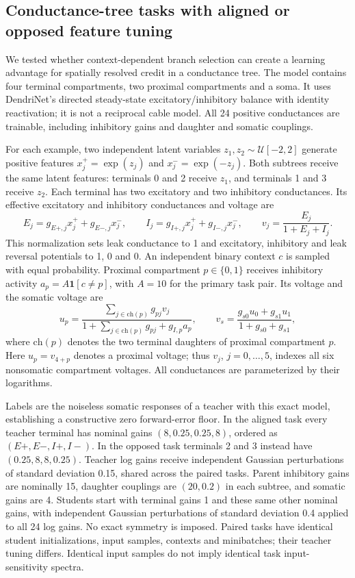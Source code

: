 \subsection*{Conductance-tree tasks with aligned or opposed feature tuning}
\label{sec:conductance-credit-demand}
We tested whether context-dependent branch selection can create a learning advantage for spatially resolved credit in a conductance tree. The model contains four terminal compartments, two proximal compartments and a soma. It uses DendriNet's directed steady-state excitatory/inhibitory balance with identity reactivation; it is not a reciprocal cable model. All 24 positive conductances are trainable, including inhibitory gains and daughter and somatic couplings.

For each example, two independent latent variables $z_1,z_2\sim\mathcal U[-2,2]$ generate positive features $x_j^+=\exp(z_j)$ and $x_j^-=\exp(-z_j)$. Both subtrees receive the same latent features: terminals 0 and 2 receive $z_1$, and terminals 1 and 3 receive $z_2$. Each terminal has two excitatory and two inhibitory conductances. Its effective excitatory and inhibitory conductances and voltage are
\begin{equation}
 E_j=g_{E+,j}x_j^++g_{E-,j}x_j^- ,\qquad
 I_j=g_{I+,j}x_j^++g_{I-,j}x_j^- ,\qquad
 v_j=\frac{E_j}{1+E_j+I_j}.
\end{equation}
This normalization sets leak conductance to 1 and excitatory, inhibitory and leak reversal potentials to 1, 0 and 0. An independent binary context $c$ is sampled with equal probability. Proximal compartment $p\in\{0,1\}$ receives inhibitory activity $a_p=A\mathbf 1[c\ne p]$, with $A=10$ for the primary task pair. Its voltage and the somatic voltage are
\begin{equation}
 u_p=\frac{\sum_{j\in\mathrm{ch}(p)}g_{pj}v_j}
 {1+\sum_{j\in\mathrm{ch}(p)}g_{pj}+g_{I,p}a_p},\qquad
 v_s=\frac{g_{s0}u_0+g_{s1}u_1}{1+g_{s0}+g_{s1}},
\end{equation}
where $\mathrm{ch}(p)$ denotes the two terminal daughters of proximal compartment $p$. Here $u_p=v_{4+p}$ denotes a proximal voltage; thus $v_j$, $j=0,\ldots,5$, indexes all six nonsomatic compartment voltages. All conductances are parameterized by their logarithms.

Labels are the noiseless somatic responses of a teacher with this exact model, establishing a constructive zero forward-error floor. In the aligned task every teacher terminal has nominal gains $(8,0.25,0.25,8)$, ordered as $(E+,E-,I+,I-)$. In the opposed task terminals 2 and 3 instead have $(0.25,8,8,0.25)$. Teacher log gains receive independent Gaussian perturbations of standard deviation 0.15, shared across the paired tasks. Parent inhibitory gains are nominally 15, daughter couplings are $(20,0.2)$ in each subtree, and somatic gains are 4. Students start with terminal gains 1 and these same other nominal gains, with independent Gaussian perturbations of standard deviation 0.4 applied to all 24 log gains. No exact symmetry is imposed. Paired tasks have identical student initializations, input samples, contexts and minibatches; their teacher tuning differs. Identical input samples do not imply identical task input-sensitivity spectra.

